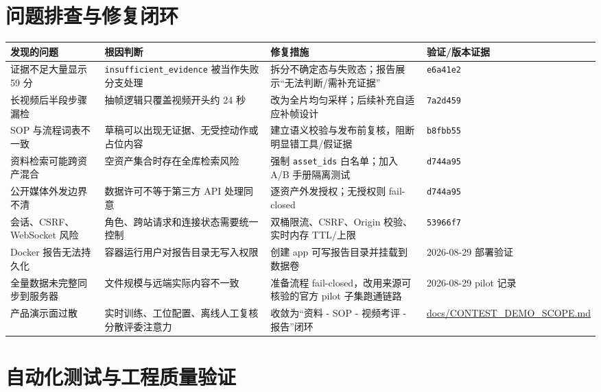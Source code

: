 \documentclass[UTF8,11pt,a4paper]{ctexart}
\newcommand{\sourcepath}[1]{{\scriptsize\url{#1}}}
\begin{document}
\section{问题排查与修复闭环}
\begin{longtable}{@{}p{29mm}p{43mm}p{49mm}p{29mm}@{}}
\toprule
\textbf{发现的问题} & \textbf{根因判断} & \textbf{修复措施} & \textbf{验证/版本证据}\\
\midrule
证据不足大量显示 59 分 & \texttt{insufficient\_evidence} 被当作失败分支处理 & 拆分不确定态与失败态；报告展示“无法判断/需补充证据” & \texttt{e6a41e2}\\
长视频后半段步骤漏检 & 抽帧逻辑只覆盖视频开头约 24 秒 & 改为全片均匀采样；后续补充自适应补帧设计 & \texttt{7a2d459}\\
SOP 与流程词表不一致 & 草稿可以出现无证据、无受控动作或占位内容 & 建立语义校验与发布前复核，阻断明显错工具/假证据 & \texttt{b8fbb55}\\
资料检索可能跨资产混合 & 空资产集合时存在全库检索风险 & 强制 \texttt{asset\_ids} 白名单；加入 A/B 手册隔离测试 & \texttt{d744a95}\\
公开媒体外发边界不清 & 数据许可不等于第三方 API 处理同意 & 逐资产外发授权；无授权则 fail-closed & \texttt{d744a95}\\
会话、CSRF、WebSocket 风险 & 角色、跨站请求和连接状态需要统一控制 & 双桶限流、CSRF、Origin 校验、实时内存 TTL/上限 & \texttt{53966f7}\\
Docker 报告无法持久化 & 容器运行用户对报告目录无写入权限 & 创建 app 可写报告目录并挂载到数据卷 & 2026-08-29 部署验证\\
全量数据未完整同步到服务器 & 文件规模与远端实际内容不一致 & 准备流程 fail-closed，改用来源可核验的官方 pilot 子集跑通链路 & 2026-08-29 pilot 记录\\
产品演示面过散 & 实时训练、工位配置、离线人工复核分散评委注意力 & 收敛为“资料 - SOP - 视频考评 - 报告”闭环 & \sourcepath{docs/CONTEST_DEMO_SCOPE.md}\\
\bottomrule
\end{longtable}

\section{自动化测试与工程质量验证}
\end{document}
